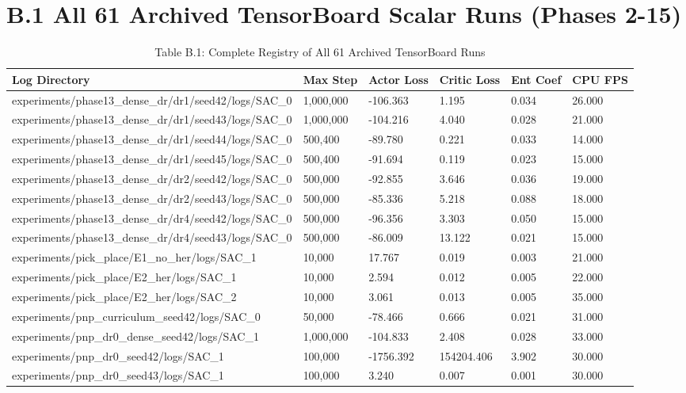 \documentclass[11pt,a4paper,oneside]{book}
\begin{document}
\section{B.1 All 61 Archived TensorBoard Scalar Runs (Phases 2-15)}
\begin{longtable}{l l l l l l}\caption{Table B.1: Complete Registry of All 61 Archived TensorBoard Runs}\\\toprule
Log Directory & Max Step & Actor Loss & Critic Loss & Ent Coef & CPU FPS \\ \midrule \endhead
experiments/phase13\_dense\_dr/dr1/seed42/logs/SAC\_0 & 1,000,000 & -106.363 & 1.195 & 0.034 & 26.000 \\
experiments/phase13\_dense\_dr/dr1/seed43/logs/SAC\_0 & 1,000,000 & -104.216 & 4.040 & 0.028 & 21.000 \\
experiments/phase13\_dense\_dr/dr1/seed44/logs/SAC\_0 & 500,400 & -89.780 & 0.221 & 0.033 & 14.000 \\
experiments/phase13\_dense\_dr/dr1/seed45/logs/SAC\_0 & 500,400 & -91.694 & 0.119 & 0.023 & 15.000 \\
experiments/phase13\_dense\_dr/dr2/seed42/logs/SAC\_0 & 500,000 & -92.855 & 3.646 & 0.036 & 19.000 \\
experiments/phase13\_dense\_dr/dr2/seed43/logs/SAC\_0 & 500,000 & -85.336 & 5.218 & 0.088 & 18.000 \\
experiments/phase13\_dense\_dr/dr4/seed42/logs/SAC\_0 & 500,000 & -96.356 & 3.303 & 0.050 & 15.000 \\
experiments/phase13\_dense\_dr/dr4/seed43/logs/SAC\_0 & 500,000 & -86.009 & 13.122 & 0.021 & 15.000 \\
experiments/pick\_place/E1\_no\_her/logs/SAC\_1 & 10,000 & 17.767 & 0.019 & 0.003 & 21.000 \\
experiments/pick\_place/E2\_her/logs/SAC\_1 & 10,000 & 2.594 & 0.012 & 0.005 & 22.000 \\
experiments/pick\_place/E2\_her/logs/SAC\_2 & 10,000 & 3.061 & 0.013 & 0.005 & 35.000 \\
experiments/pnp\_curriculum\_seed42/logs/SAC\_0 & 50,000 & -78.466 & 0.666 & 0.021 & 31.000 \\
experiments/pnp\_dr0\_dense\_seed42/logs/SAC\_1 & 1,000,000 & -104.833 & 2.408 & 0.028 & 33.000 \\
experiments/pnp\_dr0\_seed42/logs/SAC\_1 & 100,000 & -1756.392 & 154204.406 & 3.902 & 30.000 \\
experiments/pnp\_dr0\_seed43/logs/SAC\_1 & 100,000 & 3.240 & 0.007 & 0.001 & 30.000 \\

\end{longtable}
\end{document}
